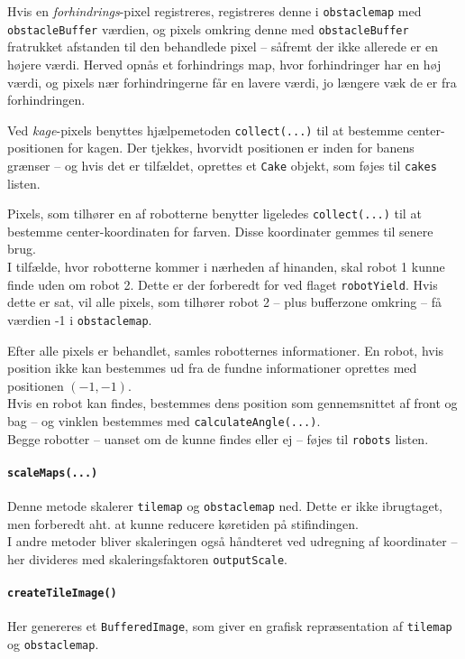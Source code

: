 Hvis en \textit{forhindrings}-pixel registreres, registreres denne i \texttt{obstaclemap} med \texttt{obstacleBuffer} værdien, og pixels omkring denne med \texttt{obstacleBuffer} fratrukket afstanden til den behandlede pixel -- såfremt der ikke allerede er en højere værdi. Herved opnås et forhindrings map, hvor forhindringer har en høj værdi, og pixels nær forhindringerne får en lavere værdi, jo længere væk de er fra forhindringen.

Ved \textit{kage}-pixels benyttes hjælpemetoden \texttt{collect(...)} til at bestemme center-positionen for kagen. Der tjekkes, hvorvidt positionen er inden for banens grænser -- og hvis det er tilfældet, oprettes et \texttt{Cake} objekt, som føjes til \texttt{cakes} listen.

Pixels, som tilhører en af robotterne benytter ligeledes \texttt{collect(...)} til at bestemme center-koordinaten for farven. Disse koordinater gemmes til senere brug.\\
I tilfælde, hvor robotterne kommer i nærheden af hinanden, skal robot 1 kunne finde uden om robot 2. Dette er der forberedt for ved flaget \texttt{robotYield}. Hvis dette er sat, vil alle pixels, som tilhører robot 2 -- plus bufferzone omkring -- få værdien -1 i \texttt{obstaclemap}.

Efter alle pixels er behandlet, samles robotternes informationer. En robot, hvis position ikke kan bestemmes ud fra de fundne informationer oprettes med positionen $(-1,-1)$.\\
Hvis en robot kan findes, bestemmes dens position som gennemsnittet af front og bag -- og vinklen bestemmes med \texttt{calculateAngle(...)}.\\
Begge robotter -- uanset om de kunne findes eller ej -- føjes til \texttt{robots} listen.

\paragraph{\texttt{scaleMaps(...)}}
Denne metode skalerer \texttt{tilemap} og \texttt{obstaclemap} ned. Dette er ikke ibrugtaget, men forberedt aht. at kunne reducere køretiden på stifindingen.\\
I andre metoder bliver skaleringen også håndteret ved udregning af koordinater -- her divideres med skaleringsfaktoren \texttt{outputScale}.

\paragraph{\texttt{createTileImage()}}
Her genereres et \texttt{BufferedImage}, som giver en grafisk repræsentation af \texttt{tilemap} og \texttt{obstaclemap}.

